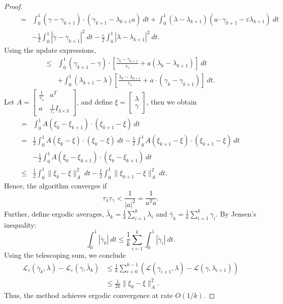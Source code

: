 \documentclass[10pt,a4paper]{amsart}
\begin{document}
\begin{proof}
\begin{align*}
    \qquad  = &\int_0^1 (\gamma - \gamma_{k+1})\cdot (\ddot{\gamma}_{k+1} - \lambda_{k+1}a)~dt +\int_0^1 (\lambda-\lambda_{k+1})(a\cdot \gamma_{k+1} - \varepsilon\lambda_{k+1})~dt \\
      \qquad  &- \frac{1}{2}\int_0^1 |\dot{\gamma} - \dot{\gamma}_{k+1}|^2~dt - \frac{\varepsilon}{2}\int_0^1 |\lambda - \lambda_{k+1}|^2~dt.
\end{align*}
Using the update expressions, 
\begin{align*}
     \leq & \int_0^1 (\gamma_{k+1}-\gamma)\cdot \left[\frac{\gamma_k -\gamma_{k+1}}{\tau_{\gamma}} + a(\lambda_k -\lambda_{k+1})\right]~dt \\
    &+ \int_0^1(\lambda_{k+1}- \lambda)\left[\frac{\lambda_k - \lambda_{k+1}}{\tau_{\lambda}}+ a\cdot(\gamma_k - \gamma_{k+1})\right]~dt.
  \end{align*}   
  Let $A = \begin{bmatrix}
    \frac{1}{\tau_{\lambda}} & a^T\\
    a & \frac{1}{\tau_{\gamma}}I_{3\times 3}
\end{bmatrix}$, and define $\xi = \begin{bmatrix}
    \lambda\\ \gamma
\end{bmatrix}$, then we obtain 
  \begin{align*} 
     =& \int_0^1 A(\xi_k - \xi_{k+1})\cdot (\xi_{k+1}-\xi)~dt \\
     = & \frac{1}{2}\int_0^1 A(\xi_k - \xi)\cdot (\xi_k - \xi)~dt - \frac{1}{2}\int_0^1A(\xi_{k+1} - \xi)\cdot (\xi_{k+1}- \xi)~dt\\ &- \frac{1}{2}\int_0^1 A(\xi_k - \xi_{k+1})\cdot (\xi_k- \xi_{k+1})~dt\\
     \leq &\frac{1}{2}\int_0^1 \|\xi_k - \xi\|_A^2~dt - \frac{1}{2}\int_0^1 \|\xi_{k+1}- \xi\|_A^2~dt.
\end{align*}
Hence, the algorithm converges if
\[\tau_{\lambda}\tau_{\gamma} < \frac{1}{|a|^2} = \frac{1}{a^Ta}.\] 
Further, define ergodic averages,    $\bar{\lambda}_k = \frac{1}{k}\sum_{i=1}^k \lambda_i$ and 
$\bar{\gamma}_k = \frac{1}{k}\sum_{i=1}^k \gamma_i$. 
By Jensen's inequality: 
\[\int_0^1 |\dot{\bar{\gamma}}_k|~dt  \leq \frac{1}{k}\sum_{i=1}^k\int_0^1 |\dot{\gamma_i}|~dt.\]
Using the telescoping sum, we conclude  
\begin{align*}
    \mathcal{L}_{\varepsilon}(\bar{\gamma}_k, \lambda) - \mathcal{L}_{\varepsilon}(\gamma, \bar{\lambda}_k) 
    & \leq \frac{1}{k}\sum_{i=0}^{k-1} (\mathcal{L}(\gamma_{i+1}, \lambda) -  \mathcal{L}(\gamma,\lambda_{i+1}))\\
     & \leq \frac{1}{2k}\|\xi_0 -  \xi\|^2_A. 
\end{align*}
Thus, the method achieves ergodic convergence at rate $O(1/k)$.
\end{proof}
\end{document}
